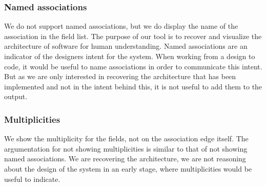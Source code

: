 	\subsubsection{Named associations}
		We do not support named associations, but we do display the name of the association in the field list. 
		The purpose of our tool is to recover and visualize the architecture of software for human understanding.
		Named associations are an indicator of the designers intent for the system.
		When working from a design to code, it would be useful to name associations in order to communicate this intent.
		But as we are only interested in recovering the architecture that has been implemented and not in the intent behind this,
		it is not useful to add them to the output.
		
	\subsubsection{Multiplicities}
		We show the multiplicity for the fields, not on the association edge itself. 
		The argumentation for not showing multiplicities is similar to that of not showing named associations.
		We are recovering the architecture, we are not reasoning about the design of the system in an early stage, 
		where multiplicities would be useful to indicate.
